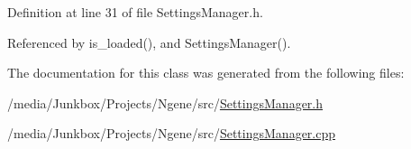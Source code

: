 Definition at line 31 of file SettingsManager.h.

Referenced by is\_\-loaded(), and SettingsManager().

The documentation for this class was generated from the following files:\begin{CompactItemize}
\item 
/media/Junkbox/Projects/Ngene/src/\hyperlink{SettingsManager_8h}{SettingsManager.h}\item 
/media/Junkbox/Projects/Ngene/src/\hyperlink{SettingsManager_8cpp}{SettingsManager.cpp}\end{CompactItemize}
